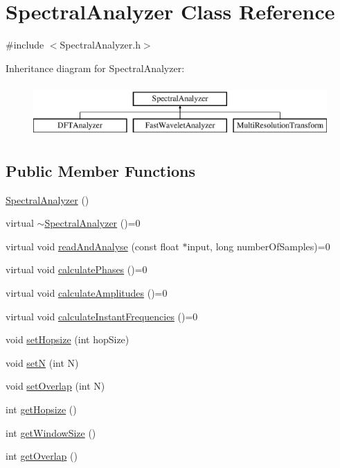 \hypertarget{class_spectral_analyzer}{\section{Spectral\+Analyzer Class Reference}
\label{class_spectral_analyzer}
}


{\ttfamily \#include $<$Spectral\+Analyzer.\+h$>$}

Inheritance diagram for Spectral\+Analyzer\+:\begin{figure}[H]
\begin{center}
\leavevmode
\includegraphics[height=2.000000cm]{class_spectral_analyzer}
\end{center}
\end{figure}
\subsection*{Public Member Functions}
\begin{DoxyCompactItemize}
\item 
\hyperlink{class_spectral_analyzer_a4f1f8101066e641d76af29dbafe2ffc4}{Spectral\+Analyzer} ()
\item 
virtual \hyperlink{class_spectral_analyzer_af15c01ed65303bf3dfd736384fcf6c2b}{$\sim$\+Spectral\+Analyzer} ()=0
\item 
virtual void \hyperlink{class_spectral_analyzer_a9d3c04321ce7c2066acfe03f5e172e4d}{read\+And\+Analyse} (const float $\ast$input, long number\+Of\+Samples)=0
\item 
virtual void \hyperlink{class_spectral_analyzer_a78d1748783b9597e6d1a3389db35c88f}{calculate\+Phases} ()=0
\item 
virtual void \hyperlink{class_spectral_analyzer_a78c2e37bef122ee6463023532abd0613}{calculate\+Amplitudes} ()=0
\item 
virtual void \hyperlink{class_spectral_analyzer_a0d3a2251d76a4083aec38b64af82b07e}{calculate\+Instant\+Frequencies} ()=0
\item 
void \hyperlink{class_spectral_analyzer_a23db8cab6892758fabc4cb779a315b96}{set\+Hopsize} (int hop\+Size)
\item 
void \hyperlink{class_spectral_analyzer_a4009ad3b900d4bc4539f76fa4dff088e}{set\+N} (int N)
\item 
void \hyperlink{class_spectral_analyzer_aa2bedb0e6e0370c2492b8d225f020b10}{set\+Overlap} (int N)
\item 
int \hyperlink{class_spectral_analyzer_afc9cfa190b98ddc1176d8ace6158c490}{get\+Hopsize} ()
\item 
int \hyperlink{class_spectral_analyzer_a87075bcd7cf8cc4c0a4729f8ed3f86c0}{get\+Window\+Size} ()
\item 
int \hyperlink{class_spectral_analyzer_a205d6ff6464ccf510afd9a7c3429276f}{get\+Overlap} ()
\end{DoxyCompactItemize}


